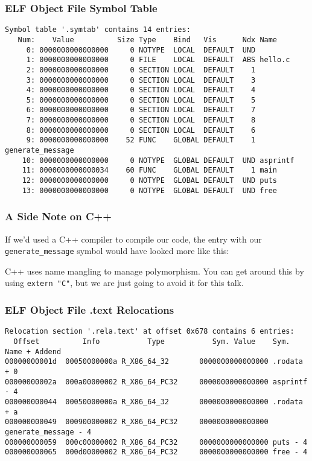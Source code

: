 \documentclass{beamer}
\begin{document}
\begin{frame}[fragile]
    \frametitle{ELF Object File Symbol Table}
    \begin{tiny}
     \begin{verbatim}
Symbol table '.symtab' contains 14 entries:
   Num:    Value          Size Type    Bind   Vis      Ndx Name
     0: 0000000000000000     0 NOTYPE  LOCAL  DEFAULT  UND
     1: 0000000000000000     0 FILE    LOCAL  DEFAULT  ABS hello.c
     2: 0000000000000000     0 SECTION LOCAL  DEFAULT    1
     3: 0000000000000000     0 SECTION LOCAL  DEFAULT    3
     4: 0000000000000000     0 SECTION LOCAL  DEFAULT    4
     5: 0000000000000000     0 SECTION LOCAL  DEFAULT    5
     6: 0000000000000000     0 SECTION LOCAL  DEFAULT    7
     7: 0000000000000000     0 SECTION LOCAL  DEFAULT    8
     8: 0000000000000000     0 SECTION LOCAL  DEFAULT    6
     9: 0000000000000000    52 FUNC    GLOBAL DEFAULT    1 generate_message
    10: 0000000000000000     0 NOTYPE  GLOBAL DEFAULT  UND asprintf
    11: 0000000000000034    60 FUNC    GLOBAL DEFAULT    1 main
    12: 0000000000000000     0 NOTYPE  GLOBAL DEFAULT  UND puts
    13: 0000000000000000     0 NOTYPE  GLOBAL DEFAULT  UND free
    \end{verbatim}
    \end{tiny}
\end{frame}

\begin{frame}[fragile]
    \frametitle{A Side Note on C++}

    If we'd used a C++ compiler to compile our code, the entry with our
    {\tt generate\_message} symbol would have looked more like this:


    C++ uses name mangling to manage polymorphism.  You can get around this by
    using {\tt extern "C"}, but we are just going to avoid it for this talk.
\end{frame}

\begin{frame}[fragile]
    \frametitle{ELF Object File .text Relocations}
    \begin{tiny}
        \begin{verbatim}
Relocation section '.rela.text' at offset 0x678 contains 6 entries:
  Offset          Info           Type           Sym. Value    Sym. Name + Addend
00000000001d  00050000000a R_X86_64_32       0000000000000000 .rodata + 0
00000000002a  000a00000002 R_X86_64_PC32     0000000000000000 asprintf - 4
000000000044  00050000000a R_X86_64_32       0000000000000000 .rodata + a
000000000049  000900000002 R_X86_64_PC32     0000000000000000 generate_message - 4
000000000059  000c00000002 R_X86_64_PC32     0000000000000000 puts - 4
000000000065  000d00000002 R_X86_64_PC32     0000000000000000 free - 4
        \end{verbatim}
    \end{tiny}
\end{frame}
\end{document}
